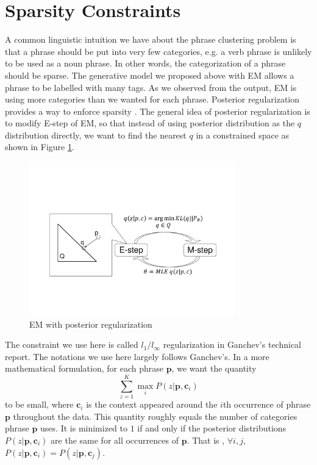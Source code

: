 \section{Sparsity Constraints}\label{sec:pr-sparse}
A common linguistic intuition we have about the phrase 
clustering problem is that a phrase should be put into very
few categories, e.g. a verb phrase is unlikely to be used as 
a noun phrase. In other words, the categorization of
a phrase should be sparse.
The generative model we proposed above with EM
allows a phrase to be labelled with many tags. As we observed
from the output, EM is using more categories than we wanted for
each phrase.
Posterior regularization
provides a way to enforce sparsity \citep{ganchev:penn:2009}.
The general idea of posterior regularization is to modify
E-step of EM, so that instead of using posterior distribution
as the $q$ distribution directly, we want to find the nearest
$q$
in a constrained space  as shown in Figure \ref{fig:EMPR}.

\begin{figure}[h]
  \centering
  \includegraphics[width=3.5in]{pr-clustering/EMPR}
  \caption{EM with posterior regularization}
  \label{fig:EMPR}
\end{figure}

The constraint we use here is called $l_1/ l_\infty$
regularization in Ganchev's technical report. The notations
we use here largely follows Ganchev's.
In a more mathematical formulation, for each phrase $\textbf{p}$,
we want the quantity 
\[\sum_{z=1}^K \max_i P(z|\textbf{p},\textbf{c}_i) \]
to be small, where $\textbf{c}_i$ is the context
appeared around the $i$th occurrence of phrase $\textbf{p}$
throughout the data. This quantity roughly equals 
the number of categories phrase $\textbf{p}$ uses.
It is minimized to $1$ if and only if
the posterior distributions $P(z|\textbf{p},\textbf{c}_i)$
are the same
for all
occurrences of $\textbf{p}$. That is ,
$\forall i,j$, $P(z|\textbf{p},\textbf{c}_i)=P(z|\textbf{p},\textbf{c}_j)$. 

